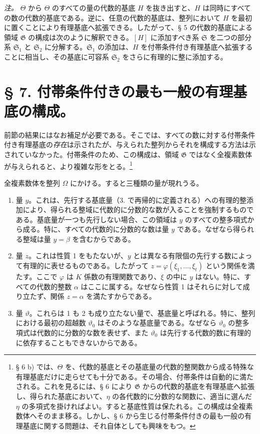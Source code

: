 \documentclass[11pt]{article}
\begin{document}
\emph{注。} $\Theta$ から $\Theta$ のすべての量の代数的基底 $H$ を抜き出すと、$H$ は同時にすべての数の代数的基底である。逆に、任意の代数的基底は、整列において $H$ を最初に置くことにより有理基底へ拡張できる。したがって、§ 5 の代数的基底による領域 $\mathfrak G$ の構成は次のように解釈できる。$[H]$ に添加すべき系 $\mathfrak S$ を二つの部分系 $\mathfrak S_1$ と $\mathfrak S_2$ に分解する。$\mathfrak S_1$ の添加は、$H$ を付帯条件付き有理基底へ拡張することに相当し、その基底に可容系 $\mathfrak S_2$ をさらに有理的に整に添加する。

\section*{§ 7. 付帯条件付きの最も一般の有理基底の構成。}

前節の結果にはなお補足が必要である。そこでは、すべての数に対する付帯条件付き有理基底の\emph{存在}は示されたが、与えられた整列からそれを構成する方法は示されていなかった。付帯条件のため、この構成は、領域 $\mathfrak G$ ではなく全複素数体が与えられると、より複雑な形をとる。\footnote{§ 6 b) では、$\Theta$ を、代数的基底とその基底量の代数的整関数から成る特殊な有理基底だけに走らせても十分である。その場合、付帯条件は自動的に満たされる。これを見るには、§ 6 により $\mathfrak G$ からの代数的基底を有理基底へ拡張し、得られた基底において、$\eta$ の各代数的に分数的な関数に、適当に選んだ $\eta$ の多項式を掛ければよい。すると基底性質は保たれる。この構成は全複素数体へそのまま移る。しかし、§ 6 から生じる付帯条件付きの最も一般の有理基底に関する問題は、それ自体としても興味をもつ。}

全複素数体を整列 $\Omega$ にかける。すると三種類の量が現れうる。
\begin{enumerate}
\item[1.] 量 $y$。これは、先行する基底量（3. で再帰的に定義される）への有理的整添加により、得られる整域に代数的に分数的な数が入ることを強制するものである。基底量が一つも先行しない場合、この領域は $y$ のすべての整多項式から成る。特に、すべての代数的に分数的な数は量 $y$ である。なぜなら得られる整域は量 $y=\beta$ を含むからである。
\item[2.] 量 $z$。これは性質 1 をもたないが、$y$ とは異なる有限個の先行する数によって有理的に表せるものである。したがって $z=\varphi(\xi_1,\ldots,\xi_t)$ という関係を満たす。ここで $\varphi$ は $K$ 係数の有理関数であり、$\xi$ の中に $y$ はない。特に、すべての代数的整数 $\alpha$ はここに属する。なぜなら性質 1 はそれらに対して成り立たず、関係 $z=\alpha$ を満たすからである。
\item[3.] 量 $\vartheta$。これらは 1 も 2 も成り立たない量で、基底量と呼ばれる。特に、整列における最初の超越数 $\vartheta_0$ はそのような基底量である。なぜなら $\vartheta_0$ の整多項式は代数的に分数的な数を表せず、また $\vartheta_0$ は先行する代数的数に有理的に依存することもできないからである。
\end{enumerate}
\end{document}
